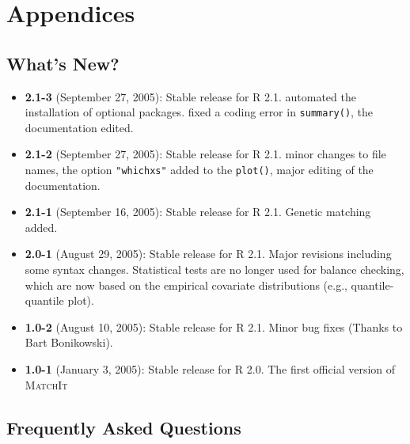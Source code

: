 \documentclass[oneside,letterpaper,12pt]{book}
\newcommand{\MatchIt}{\textsc{MatchIt}}
\begin{document}

\chapter{Appendices}

\section{What's New?}

\begin{itemize}
\item \textbf{2.1-3} (September 27, 2005): Stable release for R 2.1.
  automated the installation of optional packages. fixed a coding
  error in {\tt summary()}, the documentation edited.
\item \textbf{2.1-2} (September 27, 2005): Stable release for R 2.1.
  minor changes to file names, the option {\tt "whichxs"} added to the
  {\tt plot()}, major editing of the documentation.
\item \textbf{2.1-1} (September 16, 2005): Stable release for R
        2.1. Genetic matching added.    
\item \textbf{2.0-1} (August 29, 2005): Stable release for R 2.1.
  Major revisions including some syntax changes. Statistical tests are
  no longer used for balance checking, which are now based on the
  empirical covariate distributions (e.g., quantile-quantile plot).
\item \textbf{1.0-2} (August 10, 2005): Stable release for R
  2.1. Minor bug fixes (Thanks to Bart Bonikowski).
\item \textbf{1.0-1} (January 3, 2005): Stable release for R 2.0. The
  first official version of \MatchIt
\end{itemize}



\section{Frequently Asked Questions}

%
\end{document}
